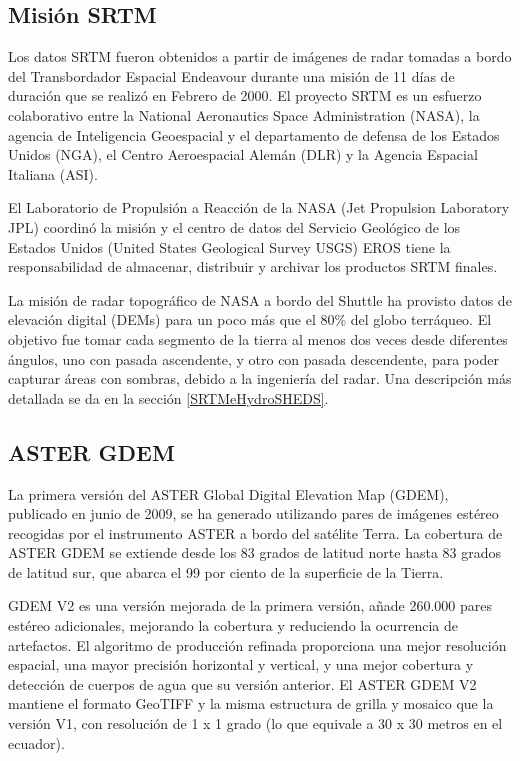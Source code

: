 \documentclass[10pt,a4paper, twoside]{report}
\begin{document}
\subsection{Misión SRTM}

Los datos SRTM fueron obtenidos a partir de imágenes de radar tomadas a bordo del Transbordador Espacial Endeavour durante una misión de 11 días de duración que se realizó en Febrero de 2000. El proyecto SRTM es un esfuerzo colaborativo entre la National Aeronautics Space Administration (NASA), la agencia de Inteligencia Geoespacial y el departamento de defensa de los Estados Unidos (NGA), el Centro Aeroespacial Alemán (DLR) y la Agencia Espacial Italiana (ASI). 

El Laboratorio de Propulsión a Reacción de la NASA (Jet Propulsion Laboratory JPL) coordinó la misión y el centro de datos del Servicio Geológico de los Estados Unidos (United States Geological Survey USGS) EROS tiene la responsabilidad de almacenar, distribuir y archivar los productos SRTM finales.

La misión de radar topográfico de NASA a bordo del Shuttle ha provisto datos de elevación digital (DEMs) para un poco más que el 80\% del globo terráqueo. El objetivo fue tomar cada segmento de la tierra al menos dos veces desde diferentes ángulos, uno con pasada ascendente, y otro con pasada descendente, para poder capturar áreas con sombras, debido a la ingeniería del radar. Una descripción más detallada se da en la sección \ref{SRTMeHydroSHEDS}.


\subsection{ASTER GDEM}

La primera versión del ASTER Global Digital Elevation Map (GDEM), publicado en junio de 2009, se ha generado utilizando pares de imágenes estéreo recogidas por el instrumento ASTER a bordo del satélite Terra. La cobertura de ASTER GDEM se extiende desde los 83 grados de latitud norte hasta 83 grados de latitud sur, que abarca el 99 por ciento de la superficie de la Tierra.

GDEM V2 es una versión mejorada de la primera versión, añade 260.000 pares estéreo adicionales, mejorando la cobertura y reduciendo la ocurrencia de artefactos. El algoritmo de producción refinada proporciona una mejor resolución espacial, una mayor precisión horizontal y vertical, y una mejor cobertura y detección de cuerpos de agua que su versión anterior. El ASTER GDEM V2 mantiene el formato GeoTIFF y la misma estructura de grilla y mosaico que la versión V1, con resolución de 1 x 1 grado (lo que equivale a 30 x 30 metros en el ecuador).
\end{document}

